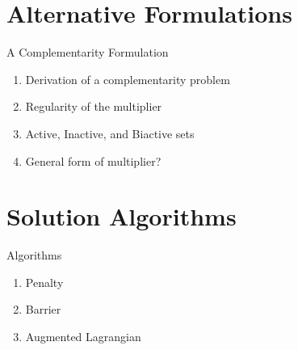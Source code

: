 \documentclass[aspectratio=169,xcolor=dvipsnames,11pt]{beamer}
\begin{document}
\section{Alternative Formulations}\label{sec:complementarity}
\begin{frame}{A Complementarity Formulation}
        \begin{enumerate}
        \item Derivation of a complementarity problem
        \item Regularity of the multiplier
        \item Active, Inactive, and Biactive sets
        \item General form of multiplier?
    \end{enumerate}
\end{frame}
\section{Solution Algorithms}\label{sec:algorithms}
\begin{frame}{Algorithms}
    \begin{enumerate}
        \item Penalty
        \item Barrier
        \item Augmented Lagrangian
    \end{enumerate}
\end{frame}


    
    
    
    
    
    
\end{document}
